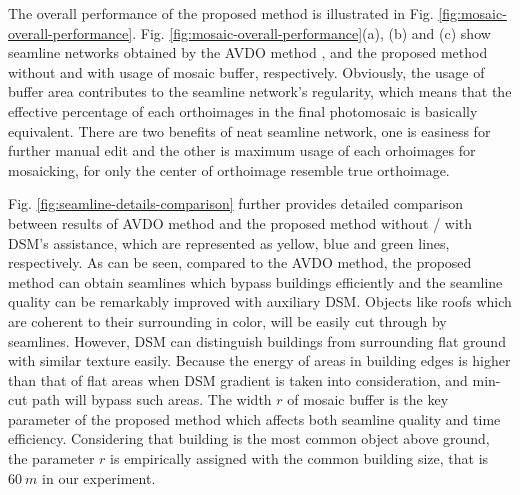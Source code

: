 \documentclass[journal]{IEEEtran}
\begin{document}
The overall performance of the proposed method is illustrated in Fig. \ref{fig:mosaic-overall-performance}. Fig. \ref{fig:mosaic-overall-performance}(a), (b) and (c) show seamline networks obtained by the AVDO method \cite{Pan2009}, and the proposed method without and with usage of mosaic buffer, respectively. Obviously, the usage of buffer area contributes to the seamline network's regularity, which means that the effective percentage of each orthoimages in the final photomosaic is basically equivalent. There are two benefits of neat seamline network, one is easiness for further manual edit and the other is maximum usage of each orhoimages for mosaicking, for only the center of orthoimage resemble true orthoimage.

Fig. \ref{fig:seamline-details-comparison} further provides detailed comparison between results of AVDO method and the proposed method without / with DSM's assistance, which are represented as yellow, blue and green lines, respectively. As can be seen, compared to the AVDO method, the proposed method can obtain seamlines which bypass buildings efficiently and the seamline quality can be remarkably improved with auxiliary DSM. Objects like roofs which are coherent to their surrounding in color, will be easily cut through by seamlines. However, DSM can distinguish buildings from surrounding flat ground with similar texture easily. Because the energy of areas in building edges is higher than that of flat areas when DSM gradient is taken into consideration, and min-cut path will bypass such areas. The width $r$ of mosaic buffer is the key parameter of the proposed method which affects both seamline quality and time efficiency. Considering that building is the most common object above ground, the parameter $r$ is empirically assigned with the common building size, that is $60~m$ in our experiment.
\end{document}
